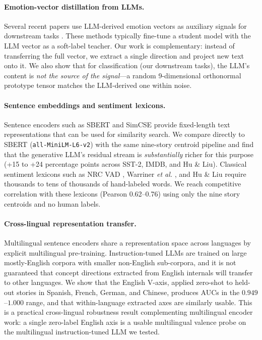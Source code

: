 \paragraph{Emotion-vector distillation from LLMs.}
Several recent papers use LLM-derived emotion vectors as auxiliary signals
for downstream tasks \cite{zhang2024emotionkd, li2025emod, aqa2024emotion}.
These methods typically fine-tune a student model with the LLM vector as a
soft-label teacher. Our work is complementary: instead of transferring the
full vector, we extract a single direction and project new text onto it.
We also show that for classification (our downstream tasks), the LLM's
content is \emph{not the source of the signal}---a random 9-dimensional
orthonormal prototype tensor matches the LLM-derived one within noise.

\paragraph{Sentence embeddings and sentiment lexicons.}
Sentence encoders such as SBERT \cite{reimers2019sentence} and SimCSE
\cite{gao2021simcse} provide fixed-length text representations that can be
used for similarity search. We compare directly to SBERT
(\texttt{all-MiniLM-L6-v2}) with the same nine-story centroid pipeline and
find that the generative LLM's residual stream is \emph{substantially} richer
for this purpose (+15 to +24 percentage points across SST-2, IMDB, and Hu \&
Liu). Classical sentiment lexicons such as NRC VAD
\cite{mohammad2018obtaining}, Warriner \textit{et al.\@}
\cite{warriner2013norms}, and Hu \& Liu \cite{huliu2004opinion} require
thousands to tens of thousands of hand-labeled words. We reach competitive
correlation with these lexicons (Pearson 0.62--0.76) using only
the nine story centroids and no human labels.

\paragraph{Cross-lingual representation transfer.}
Multilingual sentence encoders \cite{conneau2020unsupervised} share a
representation space across languages by explicit multilingual
pre-training. Instruction-tuned LLMs are trained on large mostly-English
corpora with smaller non-English sub-corpora, and it is not guaranteed
that concept directions extracted from English internals will transfer to
other languages. We show that the English V-axis, applied zero-shot to
held-out stories in Spanish, French, German, and Chinese, produces AUCs
in the $0.949$--$1.000$ range, and that within-language extracted axes
are similarly usable. This is a practical cross-lingual robustness result
complementing multilingual encoder work: a single zero-label English
axis is a usable multilingual valence probe on the multilingual
instruction-tuned LLM we tested.

